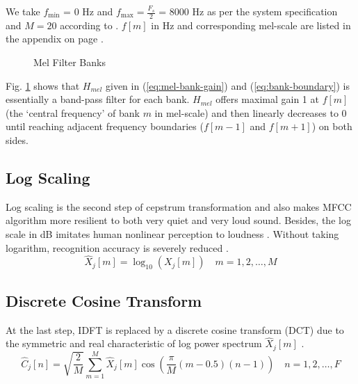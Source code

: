 We take $f_{\min}$ = 0 Hz and $f_{\max} = \frac{F_s}{2}$ = 8000 Hz as per the system specification and $M = 20$ according to \cite{davis1980comparison}. $f[m]$ in Hz and corresponding mel-scale are listed in the appendix on page \pageref{table:frequency-mel-relationship}.

\begin{figure}[H]
\centering
{}
\caption{Mel Filter Banks}
\label{mel_triangle}
\end{figure}

Fig. \ref{mel_triangle} shows that $H_{mel}$ given in (\ref{eq:mel-bank-gain}) and (\ref{eq:bank-boundary}) is essentially a band-pass filter for each bank. $H_{mel}$ offers maximal gain 1 at $f[m]$ (the `central frequency' of bank $m$ in mel-scale) and then linearly decreases to 0 until reaching adjacent frequency boundaries ($f[m-1]$ and $f[m+1]$) on both sides.


\subsection{Log Scaling}

Log scaling is the second step of cepstrum transformation and also makes MFCC algorithm more resilient to both very quiet and very loud sound. Besides, the log scale in dB imitates human nonlinear perception to loudness \cite{farin2008mathematical}. Without taking logarithm, recognition accuracy is severely reduced \cite{tan2008automatic}.
\begin{equation}
\label{eq:log-scaling}
\hat{X}_j[m] = \log_{10}(X_j[m]) \quad m = 1, 2, \dots, M
\end{equation}


\subsection{Discrete Cosine Transform}

At the last step, IDFT is replaced by a discrete cosine transform (DCT) due to the symmetric and real characteristic of log power spectrum $\hat{X}_j[m]$ \cite{picone1993signal, iser2008bandwidth}.
\begin{equation}
\label{eq:dct}
\hat{C}_j[n] = \sqrt{\frac{2}{M}} \sum^{M}_{m=1} \hat{X}_j[m] \cos \left( \frac{\pi}{M} (m - 0.5) (n-1) \right) \quad n = 1, 2, \dots, F
\end{equation}

